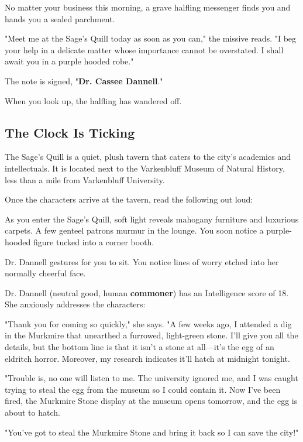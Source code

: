 \documentclass[10pt,a4paper,twoside,bg=print,twocolumn,openany,nodeprecatedcode]{dndbook}
\begin{document}
\begin{DndReadAloud}{}
No matter your business this morning, a grave halfling messenger finds you and hands you a sealed parchment.

"Meet me at the Sage's Quill today as soon as you can," the missive reads. "I beg your help in a delicate matter whose importance cannot be overstated. I shall await you in a purple hooded robe."

The note is signed, "\textbf{Dr. Cassee Dannell}."

When you look up, the halfling has wandered off.

\end{DndReadAloud}

\subsection{The Clock Is Ticking}
The Sage's Quill is a quiet, plush tavern that caters to the city's academics and intellectuals. It is located next to the Varkenbluff Museum of Natural History, less than a mile from Varkenbluff University.

Once the characters arrive at the tavern, read the following out loud:

\begin{DndReadAloud}{}
As you enter the Sage's Quill, soft light reveals mahogany furniture and luxurious carpets. A few genteel patrons murmur in the lounge. You soon notice a purple-hooded figure tucked into a corner booth.

Dr. Dannell gestures for you to sit. You notice lines of worry etched into her normally cheerful face.

\end{DndReadAloud}

Dr. Dannell (neutral good, human \textbf{commoner}) has an Intelligence score of 18. She anxiously addresses the characters:

\begin{DndReadAloud}{}
"Thank you for coming so quickly," she says. "A few weeks ago, I attended a dig in the Murkmire that unearthed a furrowed, light-green stone. I'll give you all the details, but the bottom line is that it isn't a stone at all—it's the egg of an eldritch horror. Moreover, my research indicates it'll hatch at midnight tonight.

"Trouble is, no one will listen to me. The university ignored me, and I was caught trying to steal the egg from the museum so I could contain it. Now I've been fired, the Murkmire Stone display at the museum opens tomorrow, and the egg is about to hatch.

"You've got to steal the Murkmire Stone and bring it back so I can save the city!"

\end{DndReadAloud}
\end{document}
